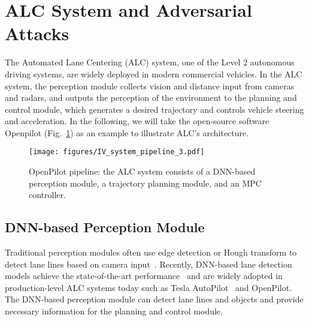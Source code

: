 \section{ALC System and Adversarial Attacks}
\label{sec:sys_model}

The Automated Lane Centering (ALC) system, one of the Level 2 autonomous driving systems, are widely deployed in modern commercial vehicles.  %
In the ALC system, the perception module collects vision and distance input from cameras and radars, and outputs the perception of the environment to the planning and control module, which generates a desired trajectory and controls vehicle steering and acceleration.  
In the following, we will take the open-source software Openpilot (Fig.~\ref{fig:openpilot}) as an example to illustrate ALC's architecture.

\begin{figure}[htbp]
\centerline{\texttt{[image: figures/IV\_system\_pipeline\_3.pdf]}}
\caption{OpenPilot pipeline: the ALC system consists of a DNN-based perception module, a trajectory planning module, and an MPC controller. %
}
\vspace{-12pt}
\label{fig:openpilot}
\end{figure}

\subsection{DNN-based Perception Module}
Traditional perception modules often use edge detection or Hough transform to detect lane lines based on camera input~\cite{low2014simple}.
Recently, DNN-based lane detection models achieve the state-of-the-art performance~\cite{wang2018lanenet} and are widely adopted in production-level ALC systems today such as Tesla AutoPilot~\cite{ingle2016tesla} and OpenPilot. The DNN-based perception module can detect lane lines and objects and provide necessary information for the planning and control module. 

